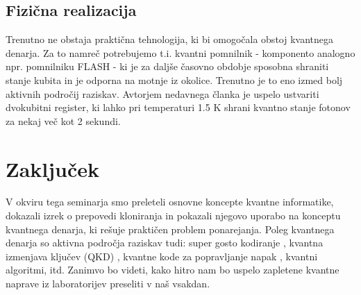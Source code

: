 \documentclass[12pt]{article}
\begin{document}
\subsection{Fizična realizacija}
Trenutno ne obstaja praktična tehnologija, ki bi omogočala obstoj kvantnega denarja. Za to namreč potrebujemo t.i. kvantni pomnilnik - komponento analogno npr. pomnilniku FLASH - ki je za daljše časovno obdobje sposobna shraniti stanje kubita in je odporna na motnje iz okolice. Trenutno je to eno izmed bolj aktivnih področij raziskav. Avtorjem nedavnega članka \cite{RobustMultiqubitQuantum} je uspelo ustvariti dvokubitni register, ki lahko pri temperaturi 1.5 $\text{K}$ shrani kvantno stanje fotonov za nekaj več kot 2 sekundi.  

\section{Zaključek}

V okviru tega seminarja smo preleteli osnovne koncepte kvantne informatike, dokazali izrek o prepovedi kloniranja in pokazali njegovo uporabo na konceptu kvantnega denarja, ki rešuje praktičen problem ponarejanja. Poleg kvantnega denarja so aktivna področja raziskav tudi: super gosto kodiranje \cite{SuperdenseCoding2023a}, kvantna izmenjava ključev (QKD) \cite{QuantumKeyDistribution2023a}, kvantne kode za popravljanje napak \cite{QuantumErrorCorrection2023}, kvantni algoritmi, itd. Zanimvo bo videti, kako hitro nam bo uspelo zapletene kvantne naprave iz laboratorijev preseliti v naš vsakdan.

\pagebreak
       
 \printbibliography[heading=bibintoc,title={Literatura}]
    
\end{document}
